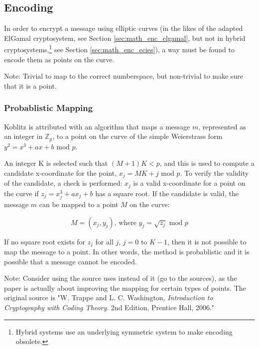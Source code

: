 \subsection{Encoding}
\label{sec:math_encoding}

In order to encrypt a message using elliptic curves (in the likes of the adapted ElGamal cryptosystem, see Section \ref{sec:math_enc_elgamal},
but not in hybrid cryptosystems,\footnote{Hybrid systems use an underlying symmetric system to make encoding obsolete.} see Section
\ref{sec:math_enc_ecies}), a way must be found to encode them as points on the curve.

Note: Trivial to map to the correct numberspace, but non-trivial to make sure that it is a point.

\subsubsection{Probablistic Mapping}

Koblitz is attributed with an algorithm that maps a message \(m\), represented as an integer in \(\mathbb{Z}_p\), to a point on the curve of the
simple Weierstrass form \(y^2 = x^3 + ax + b \text{ mod } p\).

An integer K is selected such that \((M + 1)K < p\), and this is used to compute
a candidate x-coordinate for the point, \(x_j = MK + j \text{ mod } p\). To verify the validity of the candidate, a check is performed: \(x_j\)
is a valid x-coordinate for a point on the curve if \(z_j = x_j^3 + ax_j + b\) has a square root. If the candidate is valid, the message \(m\)
can be mapped to a point \(M\) on the curve:

\begin{equation}
	M = (x_j, y_j) \text{, where } y_j = \sqrt{z_j} \text{ mod } p
\end{equation}

If no square root exists for \(z_j\) for all \(j\), \(j = 0 \text{ to } K-1\), then it is not possible to map the message to a point. In other
words, the method is probablistic and it is possible that a message cannot be encoded.\cite{MappingAMessage}

Note: Consider using the source \cite{MappingAMessage} uses instead of it (go to the sources), as the paper is actually about improving the mapping
for certain types of points. The original source is "W. Trappe and L. C. Washington, \emph{Introduction to Cryptography with Coding Theory}. 2nd Edition,
Prentice Hall, 2006."

